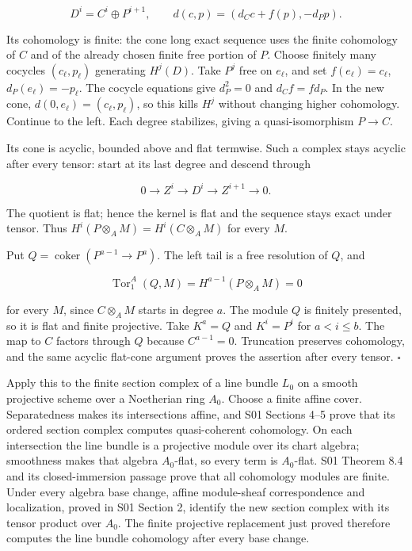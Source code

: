 \documentclass[11pt,a4paper,openany]{report}
\begin{document}
\[
D^i=C^i\oplus P^{i+1},\qquad
d(c,p)=(d_Cc+f(p),-d_Pp).
\]

Its cohomology is finite: the cone long exact sequence uses the finite cohomology of \(C\) and of the already chosen finite free portion of \(P\). Choose finitely many cocycles \((c_\ell,p_\ell)\) generating \(H^j(D)\). Take \(P^j\) free on \(e_\ell\), and set \(f(e_\ell)=c_\ell\), \(d_P(e_\ell)=-p_\ell\). The cocycle equations give \(d_P^2=0\) and \(d_Cf=fd_P\). In the new cone, \(d(0,e_\ell)=(c_\ell,p_\ell)\), so this kills \(H^j\) without changing higher cohomology. Continue to the left. Each degree stabilizes, giving a quasi-isomorphism \(P\to C\).

Its cone is acyclic, bounded above and flat termwise. Such a complex stays acyclic after every tensor: start at its last degree and descend through

\[
0\longrightarrow Z^i\longrightarrow D^i\longrightarrow Z^{i+1}\longrightarrow0.
\]

The quotient is flat; hence the kernel is flat and the sequence stays exact under tensor. Thus \(H^i(P\otimes_AM)=H^i(C\otimes_AM)\) for every \(M\).

Put \(Q=\operatorname{coker}(P^{a-1}\to P^a)\). The left tail is a free resolution of \(Q\), and

\[
\operatorname{Tor}_1^A(Q,M)=H^{a-1}(P\otimes_AM)=0
\]

for every \(M\), since \(C\otimes_AM\) starts in degree \(a\). The module \(Q\) is finitely presented, so it is flat and finite projective. Take \(K^a=Q\) and \(K^i=P^i\) for \(a<i\leq b\). The map to \(C\) factors through \(Q\) because \(C^{a-1}=0\). Truncation preserves cohomology, and the same acyclic flat-cone argument proves the assertion after every tensor. \(\square\)

Apply this to the finite section complex of a line bundle \(L_0\) on a smooth projective scheme over a Noetherian ring \(A_0\). Choose a finite affine cover. Separatedness makes its intersections affine, and S01 Sections 4--5 prove that its ordered section complex computes quasi-coherent cohomology. On each intersection the line bundle is a projective module over its chart algebra; smoothness makes that algebra \(A_0\)-flat, so every term is \(A_0\)-flat. S01 Theorem 8.4 and its closed-immersion passage prove that all cohomology modules are finite. Under every algebra base change, affine module-sheaf correspondence and localization, proved in S01 Section 2, identify the new section complex with its tensor product over \(A_0\). The finite projective replacement just proved therefore computes the line bundle cohomology after every base change.
\end{document}
